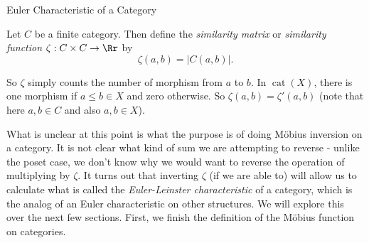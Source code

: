 \documentclass[12pt]{pom_thesis}
\DeclareMathOperator{\cat}{cat}
\begin{document}
\begin{chapter}{Euler Characteristic of a Category}
\begin{defn}
Let $C$ be a finite category. Then define the \emph{similarity matrix} or \emph{similarity function} $\zeta : C \times C \rightarrow \Rr$ by 
\[
\zeta(a,b) = |C(a,b)|.
\]
\end{defn}
So $\zeta$ simply counts the number of morphism from $a$ to $b$. In $\cat(X)$, there is one morphism if $a \leq b \in X$ and zero otherwise. So $\zeta(a,b) = \zeta'(a,b)$ (note that here $a,b \in C$ and also $a,b \in X$).

What is unclear at this point is what the purpose is of doing M\"obius inversion on a category. It is not clear what kind of sum we are attempting to reverse - unlike the poset case, we don't know why we would want to reverse the operation of multiplying by $\zeta$. It turns out that inverting $\zeta$ (if we are able to) will allow us to calculate what is called the \emph{Euler-Leinster characteristic} of a category, which is the analog of an Euler characteristic on other structures. We will explore this over the next few sections. First, we finish the definition of the M\"obius function on categories.


\end{chapter}
\end{document}
